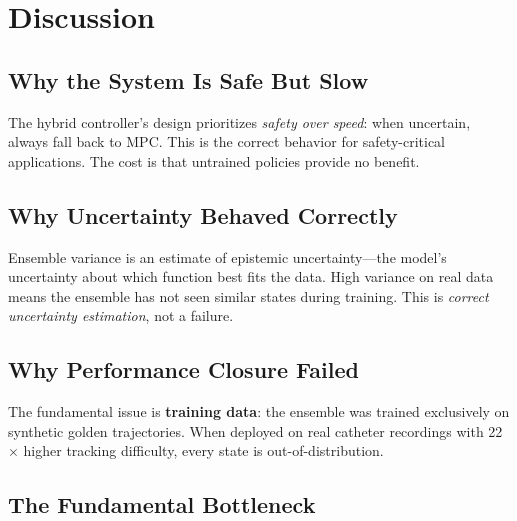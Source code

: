 \documentclass[conference]{IEEEtran}
\begin{document}
\section{Discussion}

\subsection{Why the System Is Safe But Slow}

The hybrid controller's design prioritizes \emph{safety over speed}: when uncertain, always fall back to MPC. This is the correct behavior for safety-critical applications. The cost is that untrained policies provide no benefit.

\subsection{Why Uncertainty Behaved Correctly}

Ensemble variance is an estimate of epistemic uncertainty---the model's uncertainty about which function best fits the data. High variance on real data means the ensemble has not seen similar states during training. This is \emph{correct uncertainty estimation}, not a failure.

\subsection{Why Performance Closure Failed}

The fundamental issue is \textbf{training data}: the ensemble was trained exclusively on synthetic golden trajectories. When deployed on real catheter recordings with 22$\times$ higher tracking difficulty, every state is out-of-distribution.

\subsection{The Fundamental Bottleneck}
\end{document}
